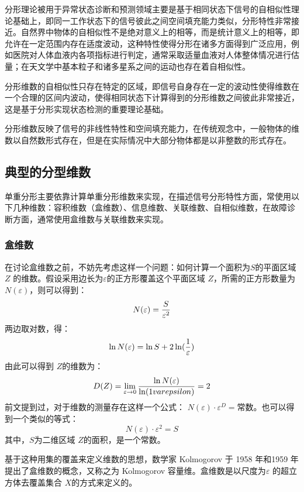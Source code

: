 分形理论被用于异常状态诊断和预测领域主要是基于相同状态下信号的自相似性理论基础上，即同一工作状态下的信号彼此之间空间填充能力类似，分形特性非常接近。自然界中物体的自相似性不是绝对意义上的相等，而是统计意义上的相等，即允许在一定范围内存在适度波动，这种特性使得分形在诸多方面得到广泛应用，例如医院对人体血液内各项指标进行判定，通常采取适量血液对人体整体情况进行估量；在天文学中基本粒子和诸多星系之间的运动也存在着自相似性。

分形维数的自相似性只存在特定的区域，即信号自身存在一定的波动性使得维数在一个合理的区间内波动，使得相同状态下计算得到的分形维数之间彼此非常接近，这是基于分形实现状态检测的重要理论基础。

分形维数反映了信号的非线性特性和空间填充能力，在传统观念中，一般物体的维数以自然数形式存在，但是在实际情况中大部分物体都是以非整数的形式存在。

\subsection{典型的分型维数}
单重分形主要依靠计算单重分形维数来实现，在描述信号分形特性方面，常使用以下几种维数：容积维数（盒维数）、信息维数、关联维数、自相似维数，在故障诊断方面，通常使用盒维数与关联维数来实现。

\subsubsection{盒维数}
在讨论盒维数之前，不妨先考虑这样一个问题：如何计算一个面积为$S$的平面区域 $Z$ 的维数。假设采用边长为$\varepsilon$的正方形覆盖这个平面区域 $Z$，所需的正方形数量为 $N(\varepsilon)$，则可以得到：
$$N(\varepsilon) = {S\over \varepsilon^2}$$
两边取对数，得：
$$ \ln N(\varepsilon) = \ln S + 2\ln ({1\over \varepsilon}) $$
由此可以得到 $Z$的维数为：
\begin{equation}
	D(Z) = \lim \limits_{\varepsilon\rightarrow0}{\ln N(\varepsilon) \over \ln ({1\\varepsilon})} = 2
\end{equation}
前文提到过，对于维数的测量存在这样一个公式： $N(\varepsilon)\cdot\varepsilon^D = \mathrm{常数}$。也可以得到一个类似的等式：
\begin{equation}
	N(\varepsilon)\cdot\varepsilon^2 = S
\end{equation}
其中，$S$为二维区域 $Z$的面积，是一个常数。

基于这种用集的覆盖来定义维数的思想，数学家 Kolmogorov 于 1958 年和1959 年提出了盒维数的概念，又称之为 Kolmogorov 容量维。盒维数是以尺度为$\varepsilon$ 的超立方体去覆盖集合 $X$的方式来定义的。

